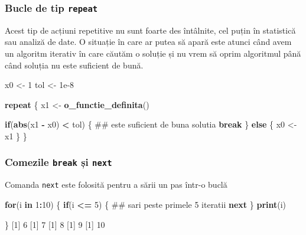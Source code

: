 \documentclass[]{article}
\newenvironment{Shaded}{\begin{snugshade}}{\end{snugshade}}
\newcommand{\KeywordTok}[1]{\textcolor[rgb]{0.13,0.29,0.53}{\textbf{#1}}}
\newcommand{\DecValTok}[1]{\textcolor[rgb]{0.00,0.00,0.81}{#1}}
\newcommand{\FloatTok}[1]{\textcolor[rgb]{0.00,0.00,0.81}{#1}}
\newcommand{\StringTok}[1]{\textcolor[rgb]{0.31,0.60,0.02}{#1}}
\newcommand{\ControlFlowTok}[1]{\textcolor[rgb]{0.13,0.29,0.53}{\textbf{#1}}}
\newcommand{\OperatorTok}[1]{\textcolor[rgb]{0.81,0.36,0.00}{\textbf{#1}}}
\newcommand{\NormalTok}[1]{#1}
\newcounter{exo}[section]
\begin{document}
\subsubsection{\texorpdfstring{Bucle de tip
\texttt{repeat}}{Bucle de tip repeat}}\label{bucle-de-tip-repeat}

Acest tip de acțiuni repetitive nu sunt foarte des întâlnite, cel puțin
în statistică sau analiză de date. O situație în care ar putea să apară
este atunci când avem un algoritm iterativ în care căutăm o soluție și
nu vrem să oprim algoritmul până când soluția nu este suficient de bună.

\begin{Shaded}
\begin{Highlighting}[]
\NormalTok{x0 <-}\StringTok{ }\DecValTok{1}
\NormalTok{tol <-}\StringTok{ }\FloatTok{1e-8}

\ControlFlowTok{repeat}\NormalTok{ \{}
\NormalTok{        x1 <-}\StringTok{ }\KeywordTok{o_functie_definita}\NormalTok{()}
        
        \ControlFlowTok{if}\NormalTok{(}\KeywordTok{abs}\NormalTok{(x1 }\OperatorTok{-}\StringTok{ }\NormalTok{x0) }\OperatorTok{<}\StringTok{ }\NormalTok{tol) \{  ## este suficient de buna solutia }
                \ControlFlowTok{break}
\NormalTok{        \} }\ControlFlowTok{else}\NormalTok{ \{}
\NormalTok{                x0 <-}\StringTok{ }\NormalTok{x1}
\NormalTok{        \} }
\NormalTok{\}}
\end{Highlighting}
\end{Shaded}

\subsubsection{\texorpdfstring{Comezile \texttt{break} și
\texttt{next}}{Comezile break și next}}\label{comezile-break-si-next}

Comanda \texttt{next} este folosită pentru a sării un pas într-o buclă

\begin{Shaded}
\begin{Highlighting}[]
\ControlFlowTok{for}\NormalTok{(i }\ControlFlowTok{in} \DecValTok{1}\OperatorTok{:}\DecValTok{10}\NormalTok{) \{}
        \ControlFlowTok{if}\NormalTok{(i }\OperatorTok{<=}\StringTok{ }\DecValTok{5}\NormalTok{) \{}
\NormalTok{                ## sari peste primele 5 iteratii}
                \ControlFlowTok{next}                 
\NormalTok{        \}}
  \KeywordTok{print}\NormalTok{(i)}
        
\NormalTok{\}}
\NormalTok{[}\DecValTok{1}\NormalTok{] }\DecValTok{6}
\NormalTok{[}\DecValTok{1}\NormalTok{] }\DecValTok{7}
\NormalTok{[}\DecValTok{1}\NormalTok{] }\DecValTok{8}
\NormalTok{[}\DecValTok{1}\NormalTok{] }\DecValTok{9}
\NormalTok{[}\DecValTok{1}\NormalTok{] }\DecValTok{10}
\end{Highlighting}
\end{Shaded}
\end{document}
